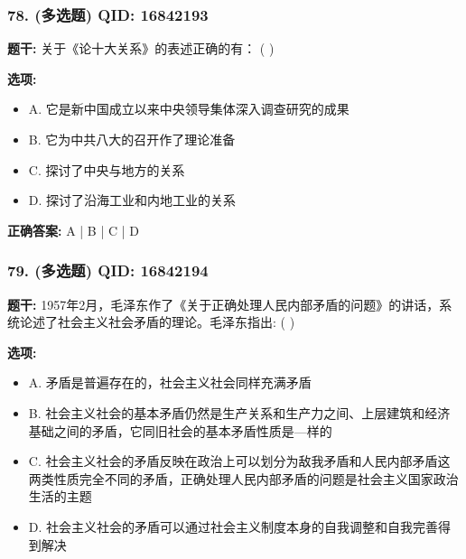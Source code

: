 \documentclass[12pt,UTF8]{ctexart}
\begin{document}
\subsubsection*{78. (多选题) \small QID: 16842193}

\textbf{题干:}
关于《论十大关系》的表述正确的有： ( )

\textbf{选项:}
\begin{itemize}[leftmargin=*]

  \item A. 它是新中国成立以来中央领导集体深入调查研究的成果

  \item B. 它为中共八大的召开作了理论准备

  \item C. 探讨了中央与地方的关系

  \item D. 探讨了沿海工业和内地工业的关系

\end{itemize}

\textbf{正确答案:}
A | B | C | D

\vspace{0.3em}\hrulefill\vspace{0.7em}

\subsubsection*{79. (多选题) \small QID: 16842194}

\textbf{题干:}
1957年2月，毛泽东作了《关于正确处理人民内部矛盾的问题》的讲话，系统论述了社会主义社会矛盾的理论。毛泽东指出: ( )

\textbf{选项:}
\begin{itemize}[leftmargin=*]

  \item A. 矛盾是普遍存在的，社会主义社会同样充满矛盾

  \item B. 社会主义社会的基本矛盾仍然是生产关系和生产力之间、上层建筑和经济基础之间的矛盾，它同旧社会的基本矛盾性质是—样的

  \item C. 社会主义社会的矛盾反映在政治上可以划分为敌我矛盾和人民内部矛盾这两类性质完全不同的矛盾，正确处理人民内部矛盾的问题是社会主义国家政治生活的主题

  \item D. 社会主义社会的矛盾可以通过社会主义制度本身的自我调整和自我完善得到解决

\end{itemize}
\end{document}
